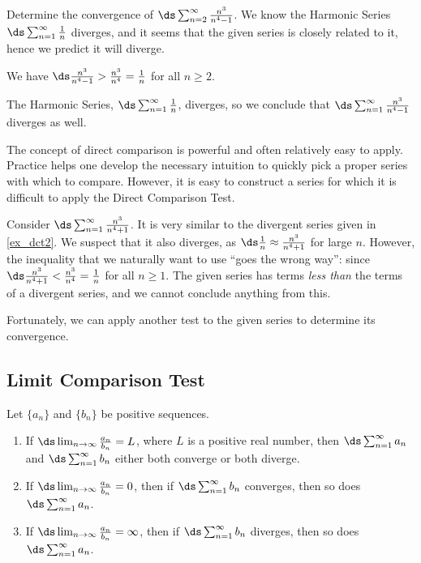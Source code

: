\begin{example}\label{ex_dct2}
Determine the convergence of $\ds\sum_{n=2}^\infty \frac{n^3}{n^4-1}$.
\solution
We know the Harmonic Series $\ds\sum_{n=1}^\infty \frac1n$ diverges, and it seems that the given series is closely related to it, hence we predict it will diverge. 

We have $\ds \frac{n^3}{n^4-1}>\frac{n^3}{n^4}=\frac{1}{n}$ for all $n\geq 2$. 

The Harmonic Series, $\ds\sum_{n=1}^\infty \frac{1}{n}$,  diverges, so we conclude that $\ds\sum_{n=1}^\infty \frac{n^3}{n^4-1}$ diverges as well.
\end{example}

The concept of direct comparison is powerful and often relatively easy to apply. Practice helps one develop the necessary intuition to quickly pick a proper series with which to compare. However, it is easy to construct a series for which it is difficult to apply the Direct Comparison Test. 

Consider $\ds\sum_{n=1}^\infty \frac{n^3}{n^4+1}$. It is very similar to the divergent series given in \autoref{ex_dct2}. We suspect that it also diverges, as $\ds \frac 1n \approx \frac{n^3}{n^4+1}$ for large $n$. However, the inequality that we naturally want to use ``goes the wrong way'': since  $\ds \frac{n^3}{n^4+1}<\frac{n^3}{n^4}=\frac{1}{n}$ for all $n\geq 1$. The given series has terms \emph{less than} the terms of a divergent series, and we cannot conclude anything from this.

Fortunately, we can apply another test to the given series to determine its convergence.

\subsection{Limit Comparison Test}

\begin{theorem}\label{thm:series_limit_compare}
Let $\{a_n\}$ and $\{b_n\}$ be positive sequences.
\begin{enumerate}
	\item If $\ds\lim_{n\to\infty} \frac{a_n}{b_n} = L$, where $L$ is a positive real number, then $\ds \sum_{n=1}^\infty a_n$ and $\ds \sum_{n=1}^\infty b_n$ either both converge or both diverge.
	\item	If $\ds\lim_{n\to\infty} \frac{a_n}{b_n} = 0$, then if $\ds \sum_{n=1}^\infty b_n$ converges, then so does $\ds \sum_{n=1}^\infty a_n$.
	\item	If $\ds\lim_{n\to\infty} \frac{a_n}{b_n} = \infty$, then if $\ds \sum_{n=1}^\infty b_n$ diverges, then so does $\ds \sum_{n=1}^\infty a_n$.
\end{enumerate}
\end{theorem}

